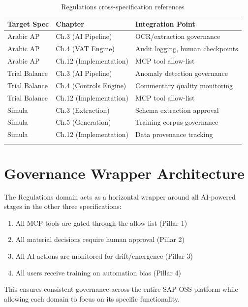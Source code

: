 \begin{longtable}{@{}p{3.5cm}p{4cm}p{5cm}@{}}
\toprule
\textbf{Target Spec} & \textbf{Chapter} & \textbf{Integration Point} \\
\midrule
\endhead
Arabic AP & Ch.3 (AI Pipeline) & OCR/extraction governance \\
Arabic AP & Ch.4 (VAT Engine) & Audit logging, human checkpoints \\
Arabic AP & Ch.12 (Implementation) & MCP tool allow-list \\
\midrule
Trial Balance & Ch.3 (AI Pipeline) & Anomaly detection governance \\
Trial Balance & Ch.4 (Controls Engine) & Commentary quality monitoring \\
Trial Balance & Ch.12 (Implementation) & MCP tool allow-list \\
\midrule
Simula & Ch.3 (Extraction) & Schema extraction approval \\
Simula & Ch.5 (Generation) & Training corpus governance \\
Simula & Ch.12 (Implementation) & Data provenance tracking \\
\bottomrule
\caption{Regulations cross-specification references}
\end{longtable}

\section{Governance Wrapper Architecture}
\label{sec:wrapper-arch}

The Regulations domain acts as a horizontal wrapper around all AI-powered
stages in the other three specifications:

\begin{enumerate}
  \item All MCP tools are gated through the allow-list (Pillar 1)
  \item All material decisions require human approval (Pillar 2)
  \item All AI actions are monitored for drift/emergence (Pillar 3)
  \item All users receive training on automation bias (Pillar 4)
\end{enumerate}

This ensures consistent governance across the entire SAP OSS platform while
allowing each domain to focus on its specific functionality.